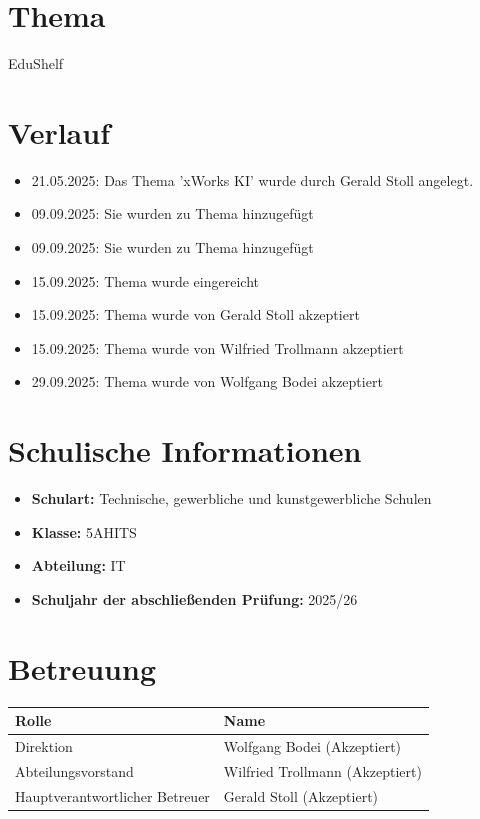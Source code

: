 \section*{Thema}
EduShelf

\section*{Verlauf}
\begin{itemize}
    \item 21.05.2025: Das Thema 'xWorks KI' wurde durch Gerald Stoll angelegt.
    \item 09.09.2025: Sie wurden zu Thema hinzugefügt
    \item 09.09.2025: Sie wurden zu Thema hinzugefügt
    \item 15.09.2025: Thema wurde eingereicht
    \item 15.09.2025: Thema wurde von Gerald Stoll akzeptiert
    \item 15.09.2025: Thema wurde von Wilfried Trollmann akzeptiert
    \item 29.09.2025: Thema wurde von Wolfgang Bodei akzeptiert
\end{itemize}

\section*{Schulische Informationen}
\begin{itemize}
    \item \textbf{Schulart:} Technische, gewerbliche und kunstgewerbliche Schulen
    \item \textbf{Klasse:} 5AHITS
    \item \textbf{Abteilung:} IT
    \item \textbf{Schuljahr der abschließenden Prüfung:} 2025/26
\end{itemize}

\section*{Betreuung}
\begin{longtable}{ll}
    \toprule
    \textbf{Rolle} & \textbf{Name} \\
    \midrule
    Direktion & Wolfgang Bodei (Akzeptiert) \\
    Abteilungsvorstand & Wilfried Trollmann (Akzeptiert) \\
    Hauptverantwortlicher Betreuer & Gerald Stoll (Akzeptiert) \\
    \bottomrule
\end{longtable}
\newpage
